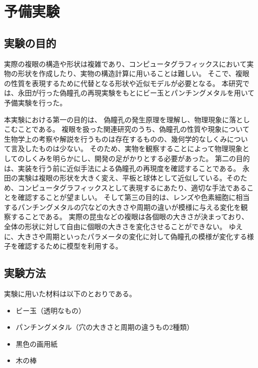 \chapter{予備実験}
\label{CExperiment}

\section{実験の目的}
\label{SExperimentPurpose}


実際の複眼の構造や形状は複雑であり、コンピュータグラフィックスにおいて実物の形状を作成したり、実物の構造計算に用いることは難しい。
そこで、複眼の性質を表現するために代替となる形状や近似モデルが必要となる。
本研究では、永田\cite{nagata-2008-03-10}が行った偽瞳孔の再現実験をもとにビー玉とパンチングメタルを用いて予備実験を行った。

本実験における第一の目的は、 偽瞳孔の発生原理を理解し、物理現象に落としこむことである。
複眼を扱った関連研究のうち、偽瞳孔の性質や現象について生物学上の考察や解説を行うものは存在するものの、幾何学的なしくみについて言及したものは少ない。
そのため、実物を観察することによって物理現象としてのしくみを明らかにし、開発の足がかりとする必要があった。
第二の目的は、実装を行う前に近似手法による偽瞳孔の再現度を確認することである。
永田の実験は複眼の形状を大きく変え、平板と球体として近似している。そのため、コンピュータグラフィックスとして表現するにあたり、適切な手法であることを確認することが望ましい。
そして第三の目的は、レンズや色素細胞に相当するパンチングメタルの穴などの大きさや周期の違いが模様に与える変化を観察することである。
実際の昆虫などの複眼は各個眼の大きさが決まっており、全体の形状に対して自由に個眼の大きさを変化させることができない。
ゆえに、大きさや周期といったパラメータの変化に対して偽瞳孔の模様が変化する様子を確認するために模型を利用する。

\section{実験方法}
\label{SExperimentMethod}

実験に用いた材料は以下のとおりである。

\begin{itemize}
\item ビー玉（透明なもの）
\item パンチングメタル（穴の大きさと周期の違うもの2種類）
\item 黒色の画用紙
\item 木の棒
\end{itemize}

